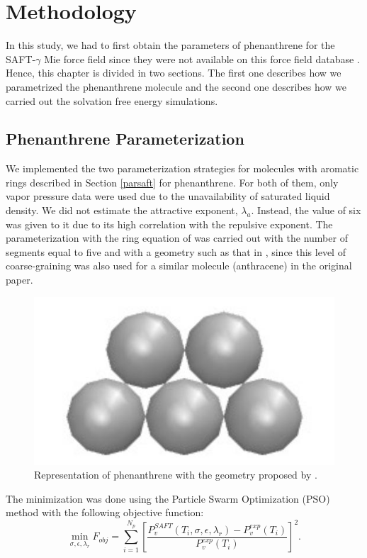 \chapter{Methodology} %

\label{Chapter4} %

In this study, we had to first obtain the parameters of phenanthrene for the SAFT-$\gamma$ Mie force field since they were not available on this force field database \cite{ervik2016}. Hence, this chapter is divided in two sections. The first one describes how we parametrized the phenanthrene molecule and the second one describes how we carried out the solvation free energy simulations. 

\section{Phenanthrene Parameterization}\label{parame}

We implemented the two parameterization strategies for molecules with aromatic rings described in Section \ref{parsaft} for phenanthrene. For both of them, only vapor pressure data \cite{pvphen} were used due to the unavailability of saturated liquid density. We did not estimate the attractive exponent, $\lambda _{a}$. Instead, the value of six was given to it due to its high correlation with the repulsive exponent. The parameterization with the ring equation of  was carried out with the number of segments equal to five and with a geometry such as that in , since this level of coarse-graining was also used for a similar molecule (anthracene) in the original paper.
\begin{figure}[th]
	\centering
	\includegraphics[width=0.25\linewidth]{Figures/fen5}
	\caption{Representation of phenanthrene with the geometry proposed by . }
	\label{fig:fen5}
\end{figure}

The minimization was done using the Particle Swarm Optimization (PSO)  method \cite{pso} with the following objective function:
\begin{equation}
\min\limits_{\sigma,\epsilon,\lambda_{r}} F_{obj} = \sum_{i=1}^{N_{p}} \left[\frac{P_{v}^{SAFT}(T_{i},\sigma,\epsilon,\lambda_{r})-P_{v}^{exp}(T_{i})}{P_{v}^{exp}(T_{i})} \right]^2 .
\label{eqn:fobjm}
\end{equation}

